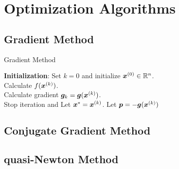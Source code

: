 \section{Optimization Algorithms}

\subsection{Gradient Method}

\begin{algorithm}[!htbp]
    \caption{Gradient Method}\label{alg:gradient-method}
    \textbf{Initialization}: Set \(k = 0\) and initialize \(\bm{x}^{(0)} \in \mathbb{R}^n\). \\
     {
        Calculate \(f(\bm{x}^{(k)})\). \\
        Calculate gradient \(\bm{g}_k = \bm{g}(\bm{x}^{(k)})\).\\
         {
            Stop iteration and Let \(\bm{x}^* = \bm{x}^{(k)}\).
        }{
            Let \(\bm{p} = -\bm{g}(\bm{x}^{(k)})\)
        }
    }
    
\end{algorithm}

\subsection{Conjugate Gradient Method}

\subsection{quasi-Newton Method}